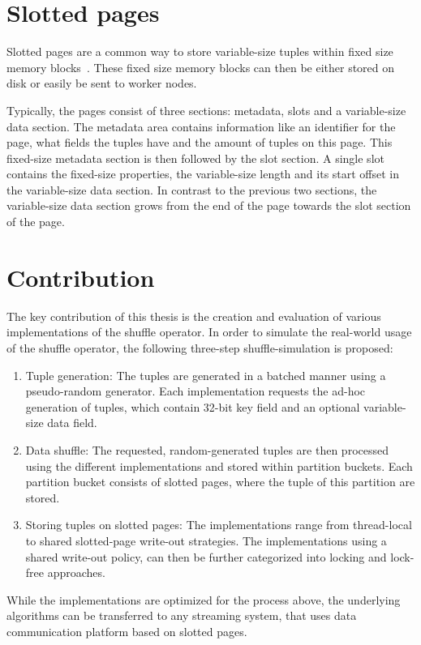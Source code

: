 \section{Slotted pages}
Slotted pages are a common way to store variable-size tuples within fixed size memory blocks~\parencite{Data-page-layouts-for-relational-databases}. These fixed size memory blocks can then be either stored on disk or easily be sent to worker nodes.

Typically, the pages consist of three sections: metadata, slots and a variable-size data section. The metadata area contains information like an identifier for the page, what fields the tuples have and the amount of tuples on this page. This fixed-size metadata section is then followed by the slot section. A single slot contains the fixed-size properties, the variable-size length and its start offset in the variable-size data section. In contrast to the previous two sections, the variable-size data section grows from the end of the page towards the slot section of the page.


\section{Contribution}
The key contribution of this thesis is the creation and evaluation of various implementations of the shuffle operator. In order to simulate the real-world usage of the shuffle operator, the following three-step shuffle-simulation is proposed:

\begin{enumerate}
    \item Tuple generation: The tuples are generated in a batched manner using a pseudo-random generator. Each implementation requests the ad-hoc generation of tuples, which contain 32-bit key field and an optional variable-size data field.

    \item Data shuffle: The requested, random-generated tuples are then processed using the different implementations and stored within partition buckets. Each partition bucket consists of slotted pages, where the tuple of this partition are stored.

    \item Storing tuples on slotted pages: The implementations range from thread-local to shared slotted-page write-out strategies. The implementations using a shared write-out policy, can then be further categorized into locking and lock-free approaches.
\end{enumerate}
While the implementations are optimized for the process above, the underlying algorithms can be transferred to any streaming system, that uses data communication platform based on slotted pages.


